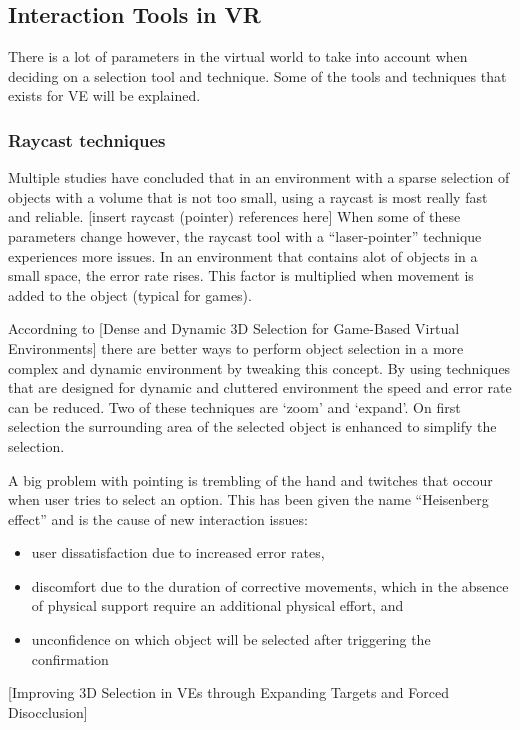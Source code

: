 \subsection{Interaction Tools in VR}
There is a lot of parameters in the virtual world to take into account when deciding on a selection tool and technique. Some of the tools and techniques that exists for VE will be explained.

\subsubsection{Raycast techniques}
Multiple studies have concluded that in an environment with a sparse selection of objects with a volume that is not too small, using a raycast is most really fast and reliable. [insert raycast (pointer) references here] When some of these parameters change however, the raycast tool with a “laser-pointer” technique experiences more issues. In an environment that contains alot of objects in a small space, the error rate rises. This factor is multiplied when movement is added to the object (typical for games).

Accordning to [Dense and Dynamic 3D Selection for Game-Based Virtual Environments] there are better ways to perform object selection in a more complex and dynamic environment by tweaking this concept. By using techniques that are designed for dynamic and cluttered environment the speed and error rate can be reduced. Two of these techniques are ‘zoom’ and ‘expand’. On first selection the surrounding area of the selected object is enhanced to simplify the selection.

A big problem with pointing is trembling of the hand and twitches that occour when user tries to select an option. This has been given the name “Heisenberg effect” and is the cause of new interaction issues:

\begin{itemize}

\item user dissatisfaction due to increased error rates,
\item discomfort due to the duration of corrective movements, which in the absence of physical support require an additional physical effort, and
\item unconfidence on which object will be selected after triggering the confirmation
\end{itemize}
[Improving 3D Selection in VEs through Expanding Targets and Forced Disocclusion]
